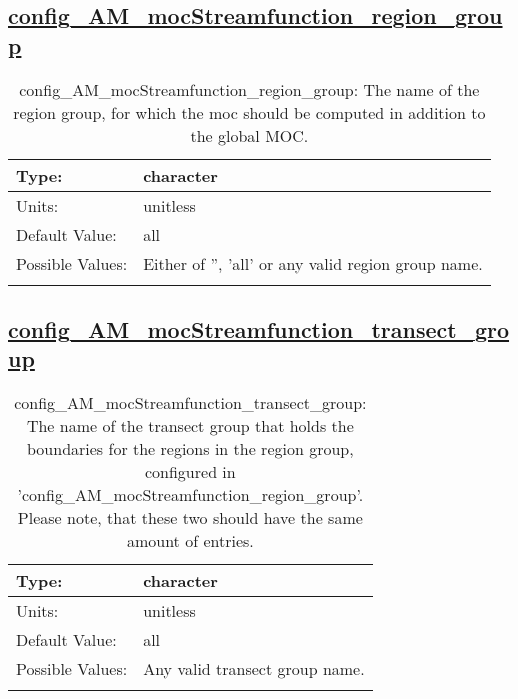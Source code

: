 \subsection[config\_AM\_mocStreamfunction\_region\_group]{\hyperref[sec:nm_tab_AM_mocStreamfunction]{config\_AM\_mocStreamfunction\_region\_group}}
\label{subsec:nm_sec_config_AM_mocStreamfunction_region_group}
\begin{center}
\begin{longtable}{| p{2.0in} || p{4.0in} |}
    \hline
    Type: & character \\
    \hline
    Units: & \si{unitless} \\
    \hline
    Default Value: & all \\
    \hline
    Possible Values: & Either of '', 'all' or any valid region group name. \\
    \hline
    \caption{config\_AM\_mocStreamfunction\_region\_group: The name of the region group, for which the moc should be computed in addition to the global MOC.}
\end{longtable}
\end{center}
\subsection[config\_AM\_mocStreamfunction\_transect\_group]{\hyperref[sec:nm_tab_AM_mocStreamfunction]{config\_AM\_mocStreamfunction\_transect\_group}}
\label{subsec:nm_sec_config_AM_mocStreamfunction_transect_group}
\begin{center}
\begin{longtable}{| p{2.0in} || p{4.0in} |}
    \hline
    Type: & character \\
    \hline
    Units: & \si{unitless} \\
    \hline
    Default Value: & all \\
    \hline
    Possible Values: & Any valid transect group name. \\
    \hline
    \caption{config\_AM\_mocStreamfunction\_transect\_group: The name of the transect group that holds the boundaries for the regions in the region group, configured in 'config\_AM\_mocStreamfunction\_region\_group'. Please note, that these two should have the same amount of entries.}
\end{longtable}
\end{center}
